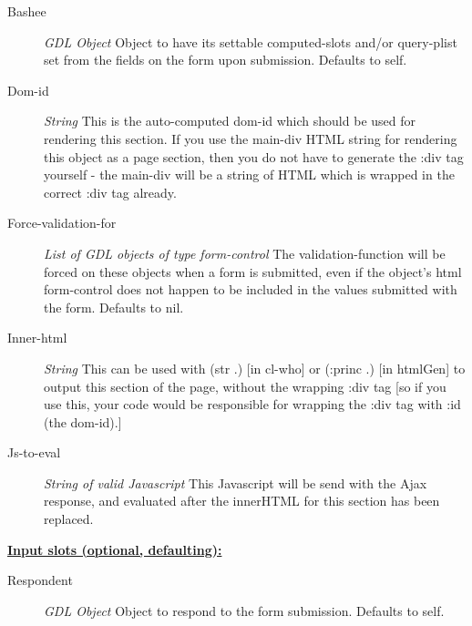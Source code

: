 \documentclass [11pt]{book}
\begin{document}
\begin{itemize}
\begin{description}
\item [Bashee]
\emph{GDL Object} Object to have its settable computed-slots and/or query-plist set
from the fields on the form upon submission. Defaults to self.


\item [Dom-id]
\emph{String} This is the auto-computed dom-id which should be used for rendering
this section. If you use the main-div HTML string for rendering this object as a
page section, then you do not have to generate the :div tag yourself - the main-div
will be a string of HTML which is wrapped in the correct :div tag already.


\item [Force-validation-for]
\emph{List of GDL objects of type form-control} The validation-function will be forced
on these objects when a form is submitted, even if the object's html form-control does
not happen to be included in the values submitted with the form. Defaults to nil.


\item [Inner-html]
\emph{String} This can be used with (str .) [in cl-who] or (:princ .) [in htmlGen]
to output this section of the page, without the wrapping :div tag [so if you use this,
your code would be responsible for wrapping the :div tag with :id (the dom-id).]


\item [Js-to-eval]
\emph{String of valid Javascript} This Javascript will be send with the Ajax response,
and evaluated after the innerHTML for this section has been replaced.


\end{description}






\textbf{
\underline{Input slots (optional, defaulting):}}

\begin{description}

\item [Respondent]
\emph{GDL Object} Object to respond to the form submission. Defaults to self.


\end{description}







\end{itemize}
\end{document}
